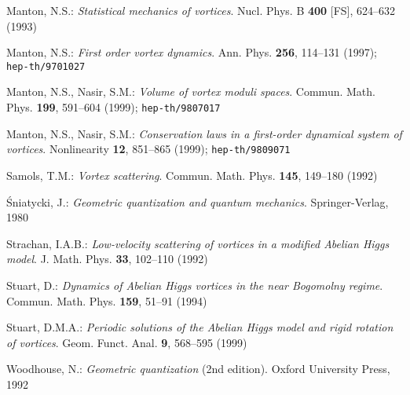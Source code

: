 \documentclass[a4paper,11pt]{article}
\begin{document}
\begin{thebibliography}{99}
\begin{small}
{\sc Manton, N.S.}: {\it Statistical mechanics of vortices}. 
Nucl. Phys. B {\bf 400} [FS], 624--632 (1993)

{\sc Manton, N.S.}: {\it First order vortex dynamics}. Ann. Phys. {\bf
256}, 114--131 (1997); {\tt hep-th/9701027}

{\sc Manton, N.S.}, {\sc Nasir, S.M.}: {\it Volume of vortex moduli
spaces}. Commun. Math. Phys. {\bf 199}, 591--604 (1999); {\tt hep-th/9807017}

{\sc Manton, N.S.}, {\sc Nasir, S.M.}: {\it Conservation laws in a
first-order dynamical system of vortices}. Nonlinearity {\bf 12},
851--865 (1999); {\tt hep-th/9809071}

{\sc Samols, T.M.}: {\it Vortex scattering}. Commun. Math. Phys. {\bf
145}, 149--180 (1992)

{\sc \'Sniatycki, J.}: {\it Geometric quantization and quantum mechanics}. 
Springer-Verlag, 1980

{\sc Strachan, I.A.B.}: {\it Low-velocity scattering of vortices in a
modified Abelian Higgs model}. J. Math. Phys. {\bf 33}, 102--110 (1992)

{\sc Stuart, D.}: {\it Dynamics of Abelian Higgs vortices in the
near Bogomolny regime}. Commun. Math. Phys. {\bf
159}, 51--91 (1994)

{\sc Stuart, D.M.A.}: {\it Periodic solutions of the Abelian Higgs model
and rigid rotation of vortices}. Geom. Funct. Anal. {\bf 9}, 568--595 (1999)

{\sc Woodhouse, N.}: {\it Geometric quantization} (2nd edition). 
Oxford University Press, 1992

\end{small}

\end{thebibliography}
\end{document}
